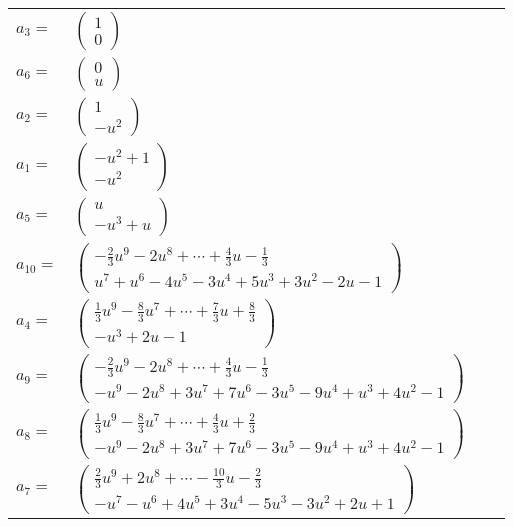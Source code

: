 \documentclass[1p]{elsarticle_modified}
\theoremstyle{definition}
\begin{document}
\begin{tabular}{m{7pt} m{180pt} m{7pt} m{180pt} }
\flushright $a_{3}=$&$\begin{pmatrix}1\\0\end{pmatrix}$ \\
\flushright $a_{6}=$&$\begin{pmatrix}0\\u\end{pmatrix}$ \\
\flushright $a_{2}=$&$\begin{pmatrix}1\\- u^2\end{pmatrix}$ \\
\flushright $a_{1}=$&$\begin{pmatrix}- u^2+1\\- u^2\end{pmatrix}$ \\
\flushright $a_{5}=$&$\begin{pmatrix}u\\- u^3+u\end{pmatrix}$ \\
\flushright $a_{10}=$&$\begin{pmatrix}-\frac{2}{3} u^9-2 u^8+\cdots+\frac{4}{3} u-\frac{1}{3}\\u^7+u^6-4 u^5-3 u^4+5 u^3+3 u^2-2 u-1\end{pmatrix}$ \\
\flushright $a_{4}=$&$\begin{pmatrix}\frac{1}{3} u^9-\frac{8}{3} u^7+\cdots+\frac{7}{3} u+\frac{8}{3}\\- u^3+2 u-1\end{pmatrix}$ \\
\flushright $a_{9}=$&$\begin{pmatrix}-\frac{2}{3} u^9-2 u^8+\cdots+\frac{4}{3} u-\frac{1}{3}\\- u^9-2 u^8+3 u^7+7 u^6-3 u^5-9 u^4+u^3+4 u^2-1\end{pmatrix}$ \\
\flushright $a_{8}=$&$\begin{pmatrix}\frac{1}{3} u^9-\frac{8}{3} u^7+\cdots+\frac{4}{3} u+\frac{2}{3}\\- u^9-2 u^8+3 u^7+7 u^6-3 u^5-9 u^4+u^3+4 u^2-1\end{pmatrix}$ \\
\flushright $a_{7}=$&$\begin{pmatrix}\frac{2}{3} u^9+2 u^8+\cdots-\frac{10}{3} u-\frac{2}{3}\\- u^7- u^6+4 u^5+3 u^4-5 u^3-3 u^2+2 u+1\end{pmatrix}$ \\

\end{tabular}
\end{document}
